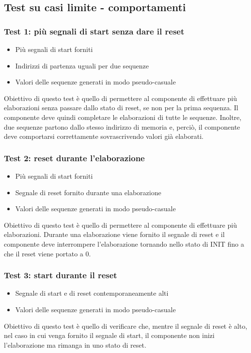 \documentclass[10pt]{article}
\begin{document}
	\subsection{Test su casi limite - comportamenti}
	\subsubsection{Test 1: più segnali di start senza dare il reset}
	\begin{itemize}
		\item Più segnali di start forniti
		\item Indirizzi di partenza uguali per due sequenze
		\item Valori delle sequenze generati in modo pseudo-casuale
	\end{itemize}
	Obiettivo di questo test è quello di permettere al componente di effettuare più elaborazioni senza passare dallo stato di reset, se non per la prima sequenza. Il componente deve quindi completare le elaborazioni di tutte le sequenze. Inoltre, due sequenze partono dallo stesso indirizzo di memoria e, perciò, il componente deve comportarsi correttamente sovrascrivendo valori già elaborati.
	\subsubsection{Test 2: reset durante l'elaborazione}
	\begin{itemize}
		\item Più segnali di start forniti
		\item Segnale di reset fornito durante una elaborazione
		\item Valori delle sequenze generati in modo pseudo-casuale
	\end{itemize}
	Obiettivo di questo test è quello di permettere al componente di effettuare più elaborazioni. Durante una elaborazione viene fornito il segnale di reset e il componente deve interrompere l'elaborazione tornando nello stato di INIT fino a che il reset viene portato a 0.
	\subsubsection{Test 3: start durante il reset}
	\begin{itemize}
		\item Segnale di start e di reset contemporaneamente alti
		\item Valori delle sequenze generati in modo pseudo-casuale
	\end{itemize}
	Obiettivo di questo test è quello di verificare che, mentre il segnale di reset è alto, nel caso in cui venga fornito il segnale di start, il componente non inizi l'elaborazione ma rimanga in uno stato di reset.
\end{document}
